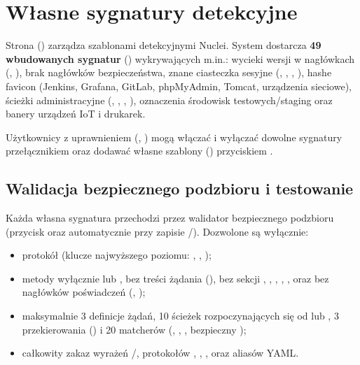 \documentclass[10pt,a4paper]{article}
\begin{document}
\section{Własne sygnatury detekcyjne}

Strona  () zarządza szablonami detekcyjnymi Nuclei. System dostarcza \textbf{49 wbudowanych sygnatur} () wykrywających m.in.: wycieki wersji w nagłówkach (, ), brak nagłówków bezpieczeństwa, znane ciasteczka sesyjne (, , , ), hashe favicon (Jenkins, Grafana, GitLab, phpMyAdmin, Tomcat, urządzenia sieciowe), ścieżki administracyjne (, , , ), oznaczenia środowisk testowych/staging oraz banery urządzeń IoT i drukarek.

Użytkownicy z uprawnieniem  (, ) mogą włączać i wyłączać dowolne sygnatury przełącznikiem  oraz dodawać własne szablony () przyciskiem .

\subsection{Walidacja bezpiecznego podzbioru i testowanie}

Każda własna sygnatura przechodzi przez walidator bezpiecznego podzbioru (przycisk  oraz automatycznie przy zapisie /). Dozwolone są wyłącznie:
\begin{itemize}
  \item protokół  (klucze najwyższego poziomu: , , );
  \item metody wyłącznie  lub , bez treści żądania (), bez sekcji , , , , ,  oraz bez nagłówków poświadczeń (, );
  \item maksymalnie 3 definicje żądań, 10 ścieżek rozpoczynających się od  lub , 3 przekierowania () i 20 matcherów (, , , bezpieczny );
  \item całkowity zakaz wyrażeń /, protokołów , , ,  oraz aliasów YAML.
\end{itemize}
\end{document}
